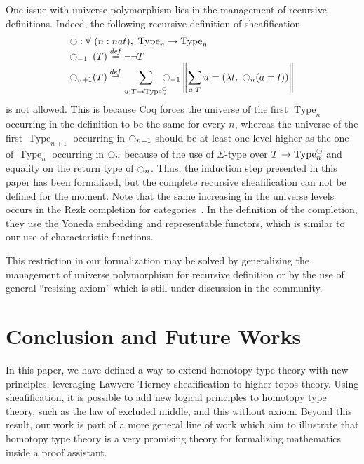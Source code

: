 \documentclass[preprint,9pt,numbers]{sigplanconf}
\newcommand \defeq {\overset{de\hspace{-0.2ex}f}{=}}
\newcommand{\mynote}[2]{
    \fbox{\bfseries\sffamily\scriptsize#1}
    {\small$\blacktriangleright$\textsf{\emph{#2}}$\blacktriangleleft$}~}
\newcommand\nt[1]{\mynote{NT}{#1}}
\DeclareMathOperator{\Type}{Type}
\newcommand{\modal}{\ensuremath{\ocircle}}
\begin{document}
One issue with universe polymorphism lies in the management of
recursive definitions. Indeed, the following recursive definition of
sheafification
%
\[ \begin{array}{l}
   \modal : \forall \ (n : nat), \ \Type_n \to \Type_n 
   \\
    \modal_{-1\phantom{n}}(T) \defeq\lnot\lnot T \\

      \displaystyle{\modal_{n+1}(T)} \defeq  
      \displaystyle{\sum_{u:T \to \Type_n^\modal} \!\!\!\!\modal_{-1} 
      \left\|
      \sum_{a:T} u= (\lambda t,~\modal_n (a=t))
      \right\|}
    \end{array}
\]
%
is not allowed. 
%
This is because Coq forces the universe of the first $\Type_n$
occurring in the definition to be the same for every $n$, whereas the
universe of the first $\Type_{n+1}$ occurring in $\modal_{n+1}$ should be at
least one level higher as the one of $\Type_n$ occurring in
$\modal_{n}$ because of the use of $\Sigma$-type over
$T \to \Type_n^\modal$ and equality on the return type of $\modal_n$.
%
%
Thus, the induction step presented in this paper has been formalized,
but the complete recursive sheafification can not be defined for the
moment.
%
Note that the same increasing in the universe levels occurs in the
Rezk completion for categories~\cite{rezk}. In the definition of the
completion, they use the Yoneda embedding and representable functors,
which is similar to our use of characteristic functions.
 
%
This restriction in our formalization may be solved by
generalizing the management of universe polymorphism for recursive definition
%
or by the use of general ``resizing axiom'' which is still under
discussion in the community.

\section{Conclusion and Future Works}
\label{sec:future-works}

In this paper, we have defined a way to extend homotopy type theory
with new principles, leveraging Lawvere-Tierney sheafification to
higher topos theory. 
%
Using sheafification, it is possible to add new logical principles to
homotopy type theory, such as the law of excluded middle, and this
without axiom.
%
Beyond this result, our work is part of a more general line of work
which aim to illustrate that homotopy type theory is a very promising
theory for formalizing mathematics inside a proof assistant.
\end{document}
